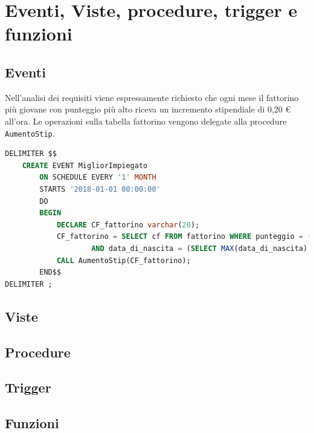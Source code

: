 \documentclass[10pt]{article}
\begin{document}
	\section{Eventi, Viste, procedure, trigger e funzioni}
		\subsection{Eventi}
		Nell'analisi dei requisiti viene espressamente richiesto che ogni mese il fattorino pi\`u giovane con punteggio pi\`u alto riceva un incremento stipendiale di 0,20 \euro{} all'ora.
		Le operazioni sulla tabella fattorino vengono delegate alla procedure \texttt{AumentoStip}.
\begin{lstlisting}[language=sql]
DELIMITER $$
	CREATE EVENT MigliorImpiegato
		ON SCHEDULE EVERY '1' MONTH
		STARTS '2018-01-01 00:00:00'
		DO 
		BEGIN
			DECLARE CF_fattorino varchar(20);
			CF_fattorino = SELECT cf FROM fattorino WHERE punteggio = (SELECT MAX(punteggio) FROM fattorino) 
					AND data_di_nascita = (SELECT MAX(data_di_nascita) FROM fattorino);
			CALL AumentoStip(CF_fattorino);
		END$$
DELIMITER ;	
\end{lstlisting}
		\subsection{Viste}
		\subsection{Procedure}
		\subsection{Trigger}
		\subsection{Funzioni}
	
\end{document}

